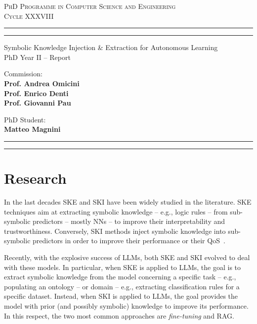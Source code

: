 \documentclass[11pt]{article}
\begin{document}
\sloppy
\begin{center}
	{{
		\Large{
			\textsc{PhD Programme in Computer Science and Engineering \\ 
			\vspace{4mm}
			Cycle XXXVIII}
			}
	}} 
	\rule[0.1cm]{\textwidth}{0.1mm}
	\rule[0.4cm]{\textwidth}{0.6mm}
\end{center}

\begin{center}
	{\LARGE{Symbolic Knowledge Injection \& Extraction for Autonomous Learning}} \\
	\vspace{4mm}
	{\large{PhD Year II -- Report}} 
	\vspace{4mm}
\end{center}
\vspace{8mm}
\par
\noindent
\begin{minipage}[t]{0.47\textwidth}

{\large{Commission: \\\bf
Prof. Andrea Omicini \\
Prof. Enrico Denti \\
Prof. Giovanni Pau}
}
\end{minipage}
\hfill
\begin{minipage}[t]{0.47\textwidth}
	\raggedleft
	{
		\large{PhD Student: \\\bf Matteo Magnini}
	}
\end{minipage}
\vspace{10mm}

{
	\raggedright
	\rule[0.1cm]{\textwidth}{0.6mm}
	\rule[0.5cm]{\textwidth}{0.1mm}
}

\newcommand{\rev}[1]{{
	#1
	}}
\section{Research}\label{sec:research}
%
In the last decades \ac{SKE} and \ac{SKI} have been widely studied in the literature.
%
\ac{SKE} techniques aim at extracting symbolic knowledge -- e.g., logic rules -- from sub-symbolic predictors -- mostly \acp{NN} -- to improve their interpretability and trustworthiness.
%
Conversely, \ac{SKI} methods inject symbolic knowledge into sub-symbolic predictors in order to improve their performance or their \ac{QoS}~\cite{DBLP:journals/aamas/AgiolloRMCO23}.

Recently, with the explosive success of \acp{LLM}, both \ac{SKE} and \ac{SKI} evolved to deal with these models.
%
In particular, when \ac{SKE} is applied to \acp{LLM}, the goal is to extract symbolic knowledge from the model concerning a specific task -- e.g., populating an ontology -- or domain -- e.g., extracting classification rules for a specific dataset.
%
Instead, when \ac{SKI} is applied to \acp{LLM}, the goal provides the model with prior (and possibly symbolic) knowledge to improve its performance.
%
In this respect, the two most common approaches are \emph{fine-tuning} and \ac{RAG}.
\end{document}
